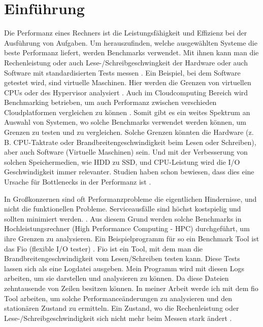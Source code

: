 \documentclass{article}
\begin{document}
\section{Einführung}
Die Performanz eines Rechners ist die Leistungsfähigkeit und Effizienz bei der Ausführung von Aufgaben. Um herauszufinden, welche ausgewählten Systeme die beste Performanz liefert, werden Benchmarks verwendet.  
Mit ihnen kann man die Rechenleistung oder auch Lese-/Schreibgeschwingkeit der Hardware oder auch Software mit standardisierten Tests messen \cite{benchmarkingBruno2014}. Ein Beispiel, bei dem Software getestet wird, sind virtuelle Maschinen.
Hier werden die Grenzen von virtuellen CPUs oder des Hypervisor analysiert \cite{9256518}.
Auch im Cloudcomputing Bereich wird Benchmarking betrieben, um auch Performanz zwischen verschieden Cloudplatformen vergleichen zu können \cite{10.1145/2493123.2462919}.  Somit gibt es ein weites Spektrum an Auswahl von Systemen, wo solche Benchmarks verwendet werden können, um Grenzen zu testen und zu vergleichen.
Solche Grenzen könnten die Hardware (z. B. CPU-Taktrate oder Brandbreitengeschwindigkeit beim Lesen oder Schreiben), aber auch Software (Virtuelle Maschinen) sein.
Und mit der Verbesserung von solchen Speichermedien, wie HDD zu SSD, und CPU-Leistung wird die I/O Geschwindigkeit immer relevanter. Studien haben schon bewiesen, dass dies eine Ursache für Bottlenecks in der Performanz ist \cite{analysisNVMeSSD}.

In Großkonzernen sind oft Performanzprobleme die eigentlichen Hindernisse, und nicht die funktionellen Probleme. Serviceausfälle sind höchst kostspielig und sollten minimiert werden. \cite{whenStopPerformanceTest}. 
Aus diesem Grund werden solche Benchmarks in Hochleistungsrechner (High Performance Computing - HPC) durchgeführt, um ihre Grenzen zu analysieren.
Ein Beispielprogramm für so ein Benchmark Tool ist das Fio (flexible I/O tester) \cite{axboe2021github}.
Fio ist ein Tool, mit dem man die Brandbreitengeschwindigkeit vom Lesen/Schreiben testen kann. Diese Tests lassen sich als eine Logdatei ausgeben.
Mein Programm wird mit diesen Logs arbeiten, um sie darstellen und analysieren zu können. Da diese Dateien zehntausende von Zeilen besitzen können.
In meiner Arbeit werde ich mit dem fio Tool arbeiten, um solche Performanceänderungen zu analysieren und den stationären Zustand zu ermitteln. Ein Zustand, wo die Rechenleistung oder Lese-/Schreibgeschwindigkeit sich nicht mehr beim Messen stark ändert \cite{vmsHotandCold}.
\end{document}
